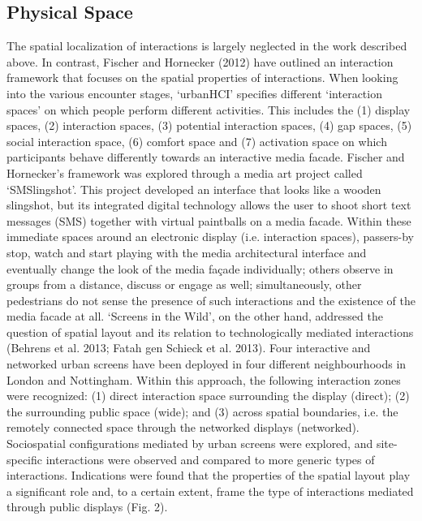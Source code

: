 \subsection* {Physical Space}
The spatial localization of interactions is largely neglected in the work described above. 
In contrast, Fischer and Hornecker (2012) have outlined an interaction framework that focuses on the spatial properties of interactions. 
When looking into the various encounter stages, ‘urbanHCI’ specifies different ‘interaction spaces’ on which people perform different activities. 
This includes the (1) display spaces, (2) interaction spaces, (3) potential interaction spaces, (4) gap spaces, (5) social interaction space, (6) comfort space and (7) activation space on which participants
behave differently towards an interactive media facade. 
Fischer and Hornecker’s framework was explored through a media art project called ‘SMSlingshot’. 
This project developed an interface that looks like a wooden slingshot, but its integrated digital technology allows the user to shoot short text messages (SMS) together with virtual paintballs on a media facade. 
Within these immediate spaces around an electronic display (i.e. interaction spaces), passers-by stop, watch and start playing with the media architectural interface and eventually change the look of the media façade individually; others observe in groups from a distance, discuss or engage as well; simultaneously, other pedestrians do not sense the presence of such interactions and the existence of the media facade at all. 
‘Screens in the Wild’, on the other hand, addressed the question of spatial layout and its relation to technologically mediated interactions (Behrens et al. 2013; Fatah gen Schieck et al. 2013). 
Four interactive and networked urban screens have been deployed in four different neighbourhoods in London and Nottingham.
Within this approach, the following interaction zones were recognized: (1) direct interaction space surrounding the display (direct); (2) the surrounding public space (wide); and (3) across spatial boundaries, i.e. the remotely connected space through the networked displays (networked).
Sociospatial configurations mediated by urban screens were explored, and site-specific interactions were observed and compared to more generic types of interactions. 
Indications were found that the properties of the spatial layout play a significant role and, to a certain extent, frame the type of interactions mediated through public displays (Fig. 2).

